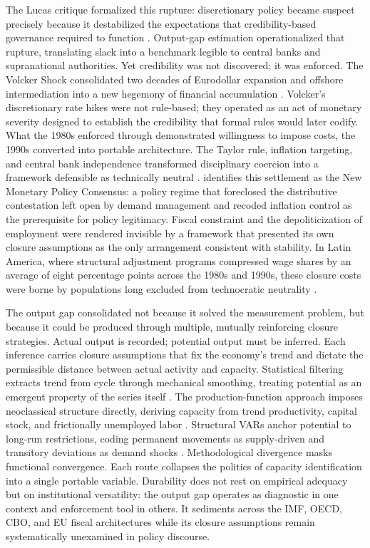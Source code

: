 \documentclass[11pt]{article}
\begin{document}
The Lucas critique formalized this rupture: discretionary policy became suspect precisely because it destabilized the expectations that credibility-based governance required to function \citep{Johnson2024}. Output-gap estimation operationalized that rupture, translating slack into a benchmark legible to central banks and supranational authorities. Yet credibility was not discovered; it was enforced. The Volcker Shock consolidated two decades of Eurodollar expansion and offshore intermediation into a new hegemony of financial accumulation \citep{Konings2007, Krippner2005}. Volcker's discretionary rate hikes were not rule-based; they operated as an act of monetary severity designed to establish the credibility that formal rules would later codify. What the 1980s enforced through demonstrated willingness to impose costs, the 1990s converted into portable architecture. The Taylor rule, inflation targeting, and central bank independence transformed disciplinary coercion into a framework defensible as technically neutral \citep{Taylor1993, Johnson2024}. \citet{SaadFilho2018} identifies this settlement as the New Monetary Policy Consensus: a policy regime that foreclosed the distributive contestation left open by demand management and recoded inflation control as the prerequisite for policy legitimacy. Fiscal constraint and the depoliticization of employment were rendered invisible by a framework that presented its own closure assumptions as the only arrangement consistent with stability. In Latin America, where structural adjustment programs compressed wage shares by an average of eight percentage points across the 1980s and 1990s, these closure costs were borne by populations long excluded from technocratic neutrality \citep{HickelEtAl2026}.

The output gap consolidated not because it solved the measurement problem, but because it could be produced through multiple, mutually reinforcing closure strategies. Actual output is recorded; potential output must be inferred. Each inference carries closure assumptions that fix the economy's trend and dictate the permissible distance between actual activity and capacity. Statistical filtering extracts trend from cycle through mechanical smoothing, treating potential as an emergent property of the series itself \citep{HodrickPrescott1997, BaxterKing1999, BeveridgeNelson1981, Hamilton2018}. The production-function approach imposes neoclassical structure directly, deriving capacity from trend productivity, capital stock, and frictionally unemployed labor \citep{CBO2004PotentialGDP, HavikEtAl2014, Alichi2015}. Structural VARs anchor potential to long-run restrictions, coding permanent movements as supply-driven and transitory deviations as demand shocks \citep{BlanchardQuah1989}. Methodological divergence masks functional convergence. Each route collapses the politics of capacity identification into a single portable variable. Durability does not rest on empirical adequacy but on institutional versatility: the output gap operates as diagnostic in one context and enforcement tool in others. It sediments across the IMF, OECD, CBO, and EU fiscal architectures while its closure assumptions remain systematically unexamined in policy discourse.
\end{document}
